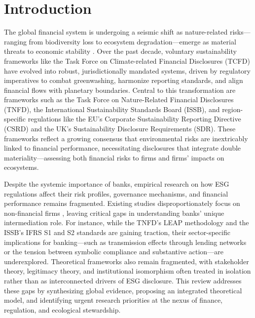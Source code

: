 \documentclass[
  authoryear]{elsarticle}
\begin{document}
\newpage

\section{Introduction}\label{introduction}

The global financial system is undergoing a seismic shift as
nature-related risks---ranging from biodiversity loss to ecosystem
degradation---emerge as material threats to economic stability
\citep{UNEP2023}. Over the past decade, voluntary sustainability
frameworks like the Task Force on Climate-related Financial Disclosures
(TCFD) have evolved into robust, jurisdictionally mandated systems,
driven by regulatory imperatives to combat greenwashing, harmonize
reporting standards, and align financial flows with planetary
boundaries. Central to this transformation are frameworks such as the
Task Force on Nature-Related Financial Disclosures (TNFD), the
International Sustainability Standards Board (ISSB), and region-specific
regulations like the EU's Corporate Sustainability Reporting Directive
(CSRD) and the UK's Sustainability Disclosure Requirements (SDR). These
frameworks reflect a growing consensus that environmental risks are
inextricably linked to financial performance, necessitating disclosures
that integrate double materiality---assessing both financial risks to
firms and firms' impacts on ecosystems.

Despite the systemic importance of banks, empirical research on how ESG
regulations affect their risk profiles, governance mechanisms, and
financial performance remains fragmented. Existing studies
disproportionately focus on non-financial firms
\citep[e.g.][]{YOUN2015, FAVINO2019, BUALLAY2019, DYCK2019}, leaving
critical gaps in understanding banks' unique intermediation role. For
instance, while the TNFD's LEAP methodology and the ISSB's IFRS S1 and
S2 standards are gaining traction, their sector-specific implications
for banking---such as transmission effects through lending networks or
the tension between symbolic compliance and substantive action---are
underexplored. Theoretical frameworks also remain fragmented, with
stakeholder theory, legitimacy theory, and institutional isomorphism
often treated in isolation rather than as interconnected drivers of ESG
disclosure. This review addresses these gaps by synthesizing global
evidence, proposing an integrated theoretical model, and identifying
urgent research priorities at the nexus of finance, regulation, and
ecological stewardship.
\end{document}
